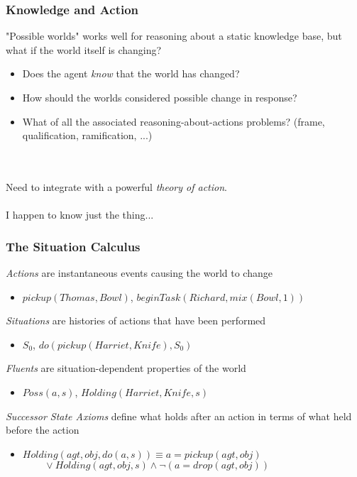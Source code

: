 \documentclass{beamer}
\begin{document}
\begin{frame}
\frametitle{Knowledge and Action}
"Possible worlds" works well for reasoning about a static knowledge base,
but what if the world itself is changing?
\begin{itemize}
\item  Does the agent \emph{know} that the world has changed?
\item  How should the worlds considered possible change in response?
\item  What of all the associated reasoning-about-actions problems? (frame, qualification, ramification, ...)
\end{itemize}
\ \\
\ \\
Need to integrate with a powerful \emph{theory of action}.
\pause
\ \\
\ \\
I happen to know just the thing...
\end{frame}

\begin{frame}
\frametitle{The Situation Calculus}
\emph{Actions} are instantaneous events causing the world to change
\begin{itemize}
  \item $pickup(Thomas,Bowl)$, $beginTask(Richard,mix(Bowl,1))$
\end{itemize}
\emph{Situations} are histories of actions that have been performed
\begin{itemize}
  \item $S_0$, $do(pickup(Harriet,Knife),S_0)$
\end{itemize}
\emph{Fluents} are situation-dependent properties of the world
\begin{itemize}
  \item $Poss(a,s)$, $Holding(Harriet,Knife,s)$
\end{itemize}
\emph{Successor State Axioms} define what holds after an action in terms of what held before the action
\begin{itemize}
  \item $Holding(agt,obj,do(a,s)) \equiv a = pickup(agt,obj)$ \\
        $\,\,\,\,\,\,\,\,\,\,\,\,\,\vee Holding(agt,obj,s) \wedge \neg\left(a = drop(agt,obj)\right)$
\end{itemize}
\end{frame}
\end{document}
